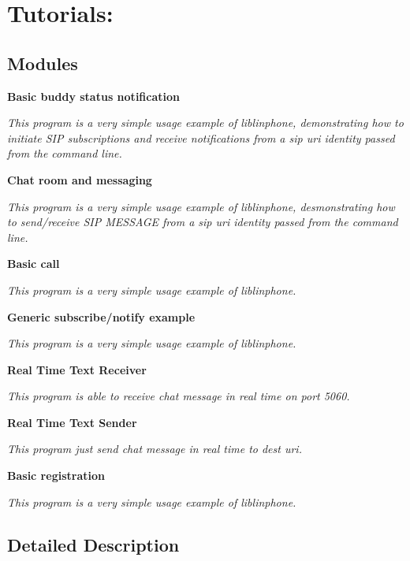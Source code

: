 \section{Tutorials\+:}
\label{group__tutorials}
\subsection*{Modules}
\begin{DoxyCompactItemize}
\item 
\textbf{ Basic buddy status notification}
\begin{DoxyCompactList}\small\item\em This program is a {\itshape very} simple usage example of liblinphone, demonstrating how to initiate S\+IP subscriptions and receive notifications from a sip uri identity passed from the command line. \end{DoxyCompactList}\item 
\textbf{ Chat room and messaging}
\begin{DoxyCompactList}\small\item\em This program is a {\itshape very} simple usage example of liblinphone, desmonstrating how to send/receive S\+IP M\+E\+S\+S\+A\+GE from a sip uri identity passed from the command line. \end{DoxyCompactList}\item 
\textbf{ Basic call}
\begin{DoxyCompactList}\small\item\em This program is a {\itshape very} simple usage example of liblinphone. \end{DoxyCompactList}\item 
\textbf{ Generic subscribe/notify example}
\begin{DoxyCompactList}\small\item\em This program is a {\itshape very} simple usage example of liblinphone. \end{DoxyCompactList}\item 
\textbf{ Real Time Text Receiver}
\begin{DoxyCompactList}\small\item\em This program is able to receive chat message in real time on port 5060. \end{DoxyCompactList}\item 
\textbf{ Real Time Text Sender}
\begin{DoxyCompactList}\small\item\em This program just send chat message in real time to dest uri. \end{DoxyCompactList}\item 
\textbf{ Basic registration}
\begin{DoxyCompactList}\small\item\em This program is a {\itshape very} simple usage example of liblinphone. \end{DoxyCompactList}\end{DoxyCompactItemize}


\subsection{Detailed Description}
